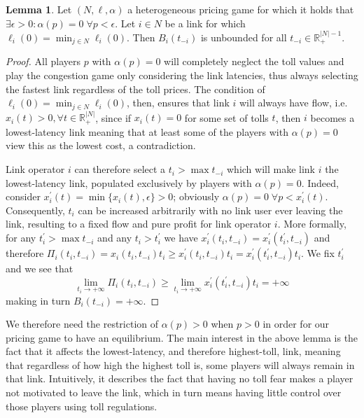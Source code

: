 \documentclass[10pt,a4paper]{book}
\newcommand{\R}{\mathbb{R}}
\theoremstyle{definition}
\newtheorem{lemma}[definition]{Lemma}
\theoremstyle{comment}
\begin{document}
\begin{lemma}
	\label{lemma:a_0_0}
	Let $(N, \ell, \alpha)$ a heterogeneous pricing game for which it holds that $\exists \epsilon > 0: \alpha(p) = 0 \; \forall p < \epsilon$.
	Let $i \in N$ be a link for which $\ell_i(0) = \min_{j \in N} \ell_i(0)$.
	Then $B_i(t_{-i})$ is unbounded for all $t_{-i} \in \R_+^{|N| - 1}$.
\end{lemma}

\begin{proof}
	All players $p$ with $\alpha(p) = 0$ will completely neglect the toll values and play the congestion game only considering the link latencies, thus always selecting the fastest link regardless of the toll prices.
	The condition of $\ell_i(0) = \min_{j \in N} \ell_i(0)$, then, ensures that link $i$ will always have flow, i.e. $x_i(t) > 0, \forall t \in \R_+^{|N|}$, since if $x_i(t) = 0$ for some set of tolls $t$, then $i$ becomes a lowest-latency link meaning that at least some of the players with $\alpha(p) = 0$ view this as the lowest cost, a contradiction.
 
	Link operator $i$ can therefore select a $t_i > \max t_{-i}$ which will make link $i$ the lowest-latency link, populated exclusively by players with $\alpha(p) = 0$.
	Indeed, consider $x_i^\prime(t) = \min\{x_i(t), \epsilon\} > 0$; obviously $\alpha(p) = 0 \; \forall p < x_i^\prime(t)$.
	Consequently, $t_i$ can be increased arbitrarily with no link user ever leaving the link, resulting to a fixed flow and pure profit for link operator $i$.
	More formally, for any $t_i^\prime > \max t_{-i}$ and any $t_i > t_i^\prime$ we have $x_i^\prime(t_i, t_{-i}) = x_i^\prime(t_i^\prime, t_{-i})$ and therefore $\Pi_i(t_i, t_{-i}) = x_i(t_i, t_{-i}) t_i \ge x_i^\prime(t_i, t_{-i}) t_i = x_i^\prime(t_i^\prime, t_{-i})t_i$.
	We fix $t_i^\prime$ and we see that
	\[
		\lim_{t_i \rightarrow +\infty} \Pi_i(t_i, t_{-i}) \ge \lim_{t_i \rightarrow +\infty} x_i^\prime(t_i^\prime, t_{-i})t_i = +\infty
	\]
	making in turn $B_i(t_{-i}) = +\infty$.
\end{proof}
We therefore need the restriction of $\alpha(p) > 0$ when $p > 0$ in order for our pricing game to have an equilibrium.
The main interest in the above lemma is the fact that it affects the lowest-latency, and therefore highest-toll, link, meaning that regardless of how high the highest toll is, some players will always remain in that link.
Intuitively, it describes the fact that having no toll fear makes a player not motivated to leave the link, which in turn means having little control over those players using toll regulations.
\end{document}

